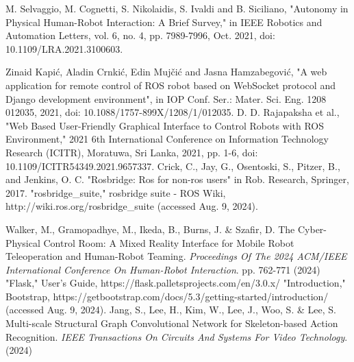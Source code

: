 \documentclass[letterpaper, 10 pt, conference]{ieeeconf}  %
\begin{document}
\begin{thebibliography}{99}
 M. Selvaggio, M. Cognetti, S. Nikolaidis, S. Ivaldi and B. Siciliano, "Autonomy in Physical Human-Robot Interaction: A Brief Survey," in IEEE Robotics and Automation Letters, vol. 6, no. 4, pp. 7989-7996, Oct. 2021, doi: 10.1109/LRA.2021.3100603.



 Zinaid Kapić, Aladin Crnkić, Edin Mujčić and Jasna Hamzabegović, "A web application for remote control of ROS robot based on WebSocket protocol and Django development environment", in IOP Conf. Ser.: Mater. Sci. Eng. 1208 012035, 2021, doi: 10.1088/1757-899X/1208/1/012035.
 D. D. Rajapaksha et al., "Web Based User-Friendly Graphical Interface to Control Robots with ROS Environment," 2021 6th International Conference on Information Technology Research (ICITR), Moratuwa, Sri Lanka, 2021, pp. 1-6, doi: 10.1109/ICITR54349.2021.9657337.
 Crick, C., Jay, G., Osentoski, S., Pitzer, B., and Jenkins, O. C. "Rosbridge: Ros for non-ros users" in Rob. Research, Springer, 2017.
"rosbridge\_suite," rosbridge suite - ROS Wiki, http://wiki.ros.org/rosbridge\_suite (accessed Aug. 9, 2024).

Walker, M., Gramopadhye, M., Ikeda, B., Burns, J. \& Szafir, D. The Cyber-Physical Control Room: A Mixed Reality Interface for Mobile Robot Teleoperation and Human-Robot Teaming. {\em Proceedings Of The 2024 ACM/IEEE International Conference On Human-Robot Interaction}. pp. 762-771 (2024)
"Flask," User’s Guide, https://flask.palletsprojects.com/en/3.0.x/
"Introduction," Bootstrap, https://getbootstrap.com/docs/5.3/getting-started/introduction/ (accessed Aug. 9, 2024).
Jang, S., Lee, H., Kim, W., Lee, J., Woo, S. \& Lee, S. Multi-scale Structural Graph Convolutional Network for Skeleton-based Action Recognition. {\em IEEE Transactions On Circuits And Systems For Video Technology}. (2024)










\end{thebibliography}
\end{document}
